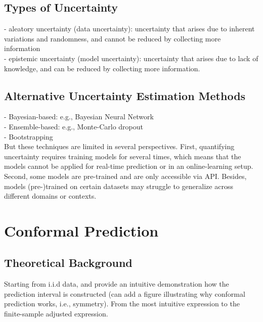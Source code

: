 \documentclass[a4paper,oneside,bibliography=totoc]{scrbook}
\begin{document}
\subsection{Types of Uncertainty}
- aleatory uncertainty (data uncertainty): uncertainty that arises due to inherent variations and randomness, and cannot be reduced by collecting more information \\
- epistemic uncertainty (model uncertainty): uncertainty that arises due to lack of knowledge, and can be reduced by collecting more information.

\subsection{Alternative Uncertainty Estimation Methods}
- Bayesian-based: e.g., Bayesian Neural Network \\
- Ensemble-based: e.g., Monte-Carlo dropout \\
- Bootstrapping \\
But these techniques are limited in several perspectives. First, quantifying uncertainty requires training models for several times, which means that the models cannot be applied for real-time prediction or in an online-learning setup. Second, some models are pre-trained and are only accessible via API. Besides, models (pre-)trained on certain datasets may struggle to generalize across different domains or contexts. 

\section{Conformal Prediction}

\subsection{Theoretical Background}
Starting from i.i.d data, and provide an intuitive demonstration how the prediction interval is constructed (can add a figure illustrating why conformal prediction works, i.e., symmetry). From the most intuitive expression to the finite-sample adjusted expression. 
		
\end{document}
